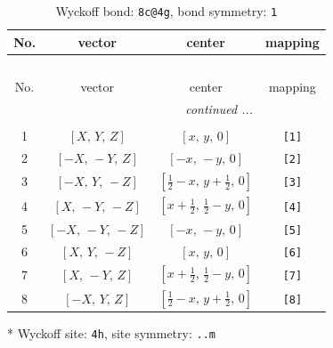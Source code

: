 \documentclass[fleqn,8pt]{jsarticle}
\begin{document}
\renewcommand{\arraystretch}{1.2}
\begin{longtable}{cccc}
\caption{Wyckoff bond: {\tt 8c@4g}, bond symmetry: {\tt 1}}
 \\
 \hline \hline
No. & vector & center & mapping \\ \hline \endfirsthead

\multicolumn{3}{l}{\tablename\ \thetable{}} \\
 \hline \hline
No. & vector & center & mapping \\ \hline \endhead

 \hline \hline
\multicolumn{3}{r}{\footnotesize\it continued ...} \\ \endfoot

 \hline \hline
\multicolumn{3}{r}{} \\ \endlastfoot

1 & $\left[ X,\, Y,\, Z \right]$ & $\left[ x,\, y,\, 0 \right]$ & {\tt [1]} \\ \hline
2 & $\left[ - X,\, - Y,\, Z \right]$ & $\left[ - x,\, - y,\, 0 \right]$ & {\tt [2]} \\ \hline
3 & $\left[ - X,\, Y,\, - Z \right]$ & $\left[ \frac{1}{2} - x,\, y + \frac{1}{2},\, 0 \right]$ & {\tt [3]} \\ \hline
4 & $\left[ X,\, - Y,\, - Z \right]$ & $\left[ x + \frac{1}{2},\, \frac{1}{2} - y,\, 0 \right]$ & {\tt [4]} \\ \hline
5 & $\left[ - X,\, - Y,\, - Z \right]$ & $\left[ - x,\, - y,\, 0 \right]$ & {\tt [5]} \\ \hline
6 & $\left[ X,\, Y,\, - Z \right]$ & $\left[ x,\, y,\, 0 \right]$ & {\tt [6]} \\ \hline
7 & $\left[ X,\, - Y,\, Z \right]$ & $\left[ x + \frac{1}{2},\, \frac{1}{2} - y,\, 0 \right]$ & {\tt [7]} \\ \hline
8 & $\left[ - X,\, Y,\, Z \right]$ & $\left[ \frac{1}{2} - x,\, y + \frac{1}{2},\, 0 \right]$ & {\tt [8]} \\
\end{longtable}
* Wyckoff site: {\tt 4h}, site symmetry: {\tt ..m}
\renewcommand{\arraystretch}{1.2}
\end{document}
